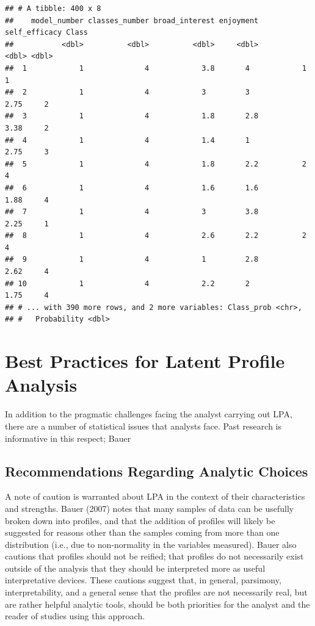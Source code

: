 \documentclass[english,man]{apa6}
\begin{document}
\begin{verbatim}
## # A tibble: 400 x 8
##    model_number classes_number broad_interest enjoyment self_efficacy Class
##           <dbl>          <dbl>          <dbl>     <dbl>         <dbl> <dbl>
##  1            1              4            3.8       4            1        1
##  2            1              4            3         3            2.75     2
##  3            1              4            1.8       2.8          3.38     2
##  4            1              4            1.4       1            2.75     3
##  5            1              4            1.8       2.2          2        4
##  6            1              4            1.6       1.6          1.88     4
##  7            1              4            3         3.8          2.25     1
##  8            1              4            2.6       2.2          2        4
##  9            1              4            1         2.8          2.62     4
## 10            1              4            2.2       2            1.75     4
## # ... with 390 more rows, and 2 more variables: Class_prob <chr>,
## #   Probability <dbl>
\end{verbatim}

\hypertarget{best-practices-for-latent-profile-analysis}{%
\section{Best Practices for Latent Profile Analysis}\label{best-practices-for-latent-profile-analysis}}

In addition to the pragmatic challenges facing the analyst carrying out LPA, there
are a number of statistical issues that analysts face. Past research is informative in
this respect; Bauer

\hypertarget{recommendations-regarding-analytic-choices}{%
\subsection{Recommendations Regarding Analytic Choices}\label{recommendations-regarding-analytic-choices}}

A note of caution is warranted about LPA in the context of their characteristics
and strengths. Bauer (2007) notes that many samples of data can be usefully
broken down into profiles, and that the addition of profiles will likely be
suggested for reasons other than the samples coming from more than one
distribution (i.e., due to non-normality in the variables measured). Bauer also
cautions that profiles should not be reified; that profiles do not necessarily
exist outside of the analysis that they should be interpreted more as useful
interpretative devices. These cautions suggest that, in general, parsimony,
interpretability, and a general sense that the profiles are not necessarily
real, but are rather helpful analytic tools, should be both priorities for the
analyst and the reader of studies using this approach.
\end{document}
